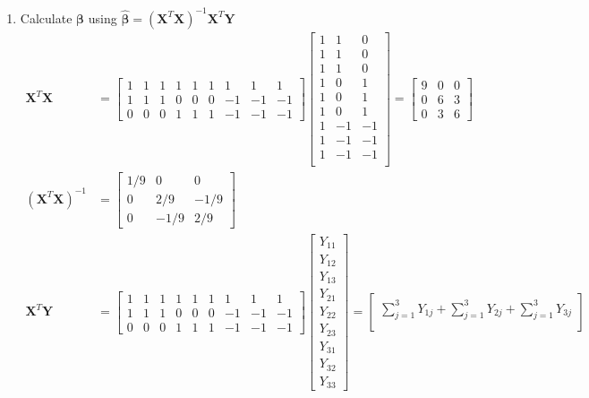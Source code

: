\documentclass{article}
\begin{document}
\begin{enumerate}[leftmargin = 0 em, label = \arabic*., font = \bfseries]
\begin{enumerate}
		\item 
		Calculate $\bm \beta$ using $\hat{\bm \beta} = (\bm X^T \bm X)^{-1}\bm X^{T}\bm Y$
		\begin{align*}
		\bm X^T \bm X &= \begin{bmatrix}
			1&1&1&1&1&1&1&1&1\\
			1&1&1&0&0&0&-1&-1&-1\\
			0&0&0&1&1&1&-1&-1&-1
		\end{bmatrix} 
		\begin{bmatrix}
			1&1&0\\
			1&1&0\\
			1&1&0\\
			1&0&1\\
			1&0&1\\
			1&0&1\\
			1&-1&-1\\
			1&-1&-1\\
			1&-1&-1\\
		\end{bmatrix}
		= \begin{bmatrix}
			9&0&0\\
			0&6&3\\
			0&3&6
		\end{bmatrix}
		\\
		(\bm X^T \bm X)^{-1} &= 
		\begin{bmatrix}
			1/9 & 0 & 0\\
			0 & 2/9 & -1/9\\
			0 & -1/9 & 2/9
		\end{bmatrix}
		\\
		\bm X^T \bm Y & = \begin{bmatrix}
			1&1&1&1&1&1&1&1&1\\
			1&1&1&0&0&0&-1&-1&-1\\
			0&0&0&1&1&1&-1&-1&-1
		\end{bmatrix}
		\begin{bmatrix}
			Y_{11}\\
			Y_{12}\\
			Y_{13}\\
			Y_{21}\\
			Y_{22}\\
			Y_{23}\\
			Y_{31}\\
			Y_{32}\\
			Y_{33}
		\end{bmatrix}
		= \begin{bmatrix}
			\sum_{j = 1}^3 Y_{1j} + \sum_{j = 1}^3 Y_{2j} + \sum_{j = 1}^3 Y_{3j}\\

\end{bmatrix}
\end{align*}
\end{enumerate}
\end{enumerate}
\end{document}
